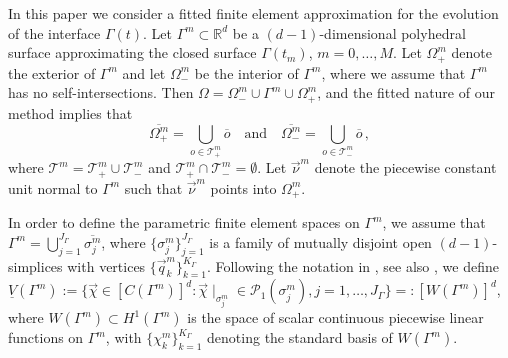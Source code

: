 \documentclass[a4paper,12pt,onecolumn]{article}
\newcommand{\R}{{\mathbb R}}
\newcommand{\Vh}{\underline{V}(\Gamma^m)}
\newcommand{\Wh}{W(\Gamma^m)}
\begin{document}
In this paper we consider a fitted finite element approximation for the
evolution of the interface $\Gamma(t)$. Let $\Gamma^{m}\subset\R^d$ be a
$(d-1)$-dimensional polyhedral surface approximating the closed surface
$\Gamma(t_m)$, $m=0 ,\ldots, M$. Let $\Omega^m_+$ denote the exterior of
$\Gamma^m$ and let $\Omega^m_-$ be the interior of $\Gamma^m$, where we assume
that $\Gamma^m$ has no self-intersections. Then
$\Omega = \Omega_-^m \cup \Gamma^m \cup \Omega_+^m$, and the fitted nature of
our method implies that
\begin{equation} \label{eq:fittedO}
\overline{\Omega^m_+} = \bigcup_{o \in \mathcal{T}^m_+} \overline{o}
\quad\text{and}\quad
\overline{\Omega^m_-} = \bigcup_{o \in \mathcal{T}^m_-} \overline{o} \,,
\end{equation}
where $\mathcal{T}^m = \mathcal{T}^m_+ \cup \mathcal{T}^m_-$ and
$\mathcal{T}^m_+ \cap \mathcal{T}^m_- = \emptyset$.
Let $\vec{\nu}^m$ denote the piecewise constant unit normal to $\Gamma^m$
such that $\vec\nu^m$ points into $\Omega^m_+$.

In order to define the parametric finite element spaces on $\Gamma^m$, we
assume that $\Gamma^m=\bigcup_{j=1}^{J_\Gamma} \overline{\sigma^m_j}$, where
$\{\sigma^m_j\}_{j=1}^{J_\Gamma}$ is a family of mutually disjoint open
$(d-1)$-simplices with vertices $\{\vec{q}^m_k\}_{k=1}^{K_\Gamma}$. Following
the notation in \cite{spurious}, see also \cite{gflows3d}, we define
$\Vh := \{\vec\chi \in [C(\Gamma^m)]^d:\vec\chi\!\mid_{\sigma^m_j}
\in \mathcal{P}_1(\sigma^m_j), j=1,\ldots, J_\Gamma\} =: [\Wh]^d$,
where $\Wh \subset H^1(\Gamma^m)$ is the space of scalar continuous
piecewise linear functions on $\Gamma^m$, with $\{\chi^m_k\}_{k=1}^{K_\Gamma}$
denoting the standard basis of $\Wh$.
\end{document}
